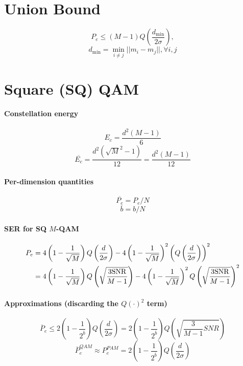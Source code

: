 \section*{Union Bound}
$$P_e \le (M-1) Q\left( \frac {d_{\textrm{min}}} {2\sigma} \right),$$
$$d_{\textrm{min}} = \min_{i \ne j} ||m_i - m_j||, \forall i,j$$

\section*{Square (SQ) QAM}

\paragraph{Constellation energy}
\[
E_c = \frac{d^2 (M-1)}{6}
\]
\[
\overline{E_c} = \frac{d^2 (\sqrt{M}^2-1)}{12} = \frac{d^2 (M-1)}{12}
\]

\paragraph{Per-dimension quantities}
\[
\overline{P_e} = P_e / N
\]
\[
\overline{b} = b/N
\]

\paragraph{SER for SQ $M$-QAM}
\begin{align*}
P_e &= 4 \left(1 - \frac 1 {\sqrt{M}} \right) Q \left( \frac{d}{2 \sigma} \right) -	4 \left(1 - \frac 1 {\sqrt{M}}\right)^2 \left( Q \left( \frac{d}{2 \sigma} \right) \right) ^2	\\
    &=  4 \left(1 - \frac 1 {\sqrt{M}} \right) Q \left( \sqrt{\frac{3 {\textrm{SNR}}}{M-1}} \right) -	4 \left(1 - \frac 1 {\sqrt{M}}\right)^2 Q \left( \sqrt{\frac{3 {\textrm{SNR}}}{M-1}} \right)^2
	\label{eq:qam_pe}
\end{align*}

\paragraph{Approximations (discarding the $Q(\cdot)^2$ term)}
\begin{equation}
	\overline{P}_e \le 2 \left(1 - \frac 1 { 2^{\overline{b}} } \right)	Q \left( \frac{d}{2 \sigma} \right)
	 = 2 \left(1 - \frac 1 {2^{\overline{b}}}\right) Q \left( \sqrt{\frac{3}{M-1}SNR} \right)
	\label{eq:qam_pe_approx}
\end{equation}
\begin{equation}
	\overline{P}_e^{QAM} \approx P_e^{PAM} = 2 \left(1 - \frac 1 { 2^{\overline{b}} } \right)	Q \left( \frac{d}{2 \sigma} \right)
	\label{eq:prob_errors}
\end{equation}

